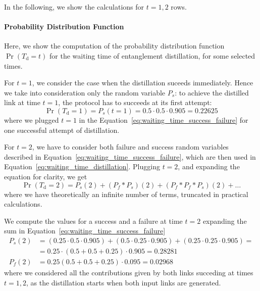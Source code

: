 \documentclass{masterthesis}
\begin{document}
In the following, we show the calculations for $t={1,2}$ rows.

\paragraph*{Probability Distribution Function}

Here, we show the computation of the probability distribution function $\Pr(T_{\text{d}} = t)$ for the waiting time of entanglement distillation, for some selected times.

For $t = 1$, we consider the case when the distillation suceeds immediately. Hence we take into consideration only the random variable $P_s$: to achieve the distilled link at time $t=1$, the protocol has to succeeds at its first attempt: 
\begin{equation}
    \Pr(T_{\text{d}} = 1) = P_s(t = 1) = 0.5 \cdot 0.5 \cdot 0.905 = 0.22625
\end{equation}
where we plugged $t = 1$ in the Equation~\ref{eq:waiting_time_success_failure} for one successful attempt of distillation.

For $t = 2$, we have to consider both failure and success random variables described in Equation~\ref{eq:waiting_time_success_failure}, which are then used in Equation~\ref{eq:waiting_time_distillation}. Plugging $t=2$, and expanding the equation for clarity, we get 
\begin{equation}\label{eq:distillation_t2}
    \Pr(T_{\text{d}} = 2) = P_s(2) + (P_f \ast P_s)(2) + (P_f \ast P_f \ast P_s)(2) + \ldots
\end{equation}
where we have theoretically an infinite number of terms, truncated in practical calculations.

We compute the values for a success and a failure at time $t=2$ expanding the sum in Equation~\ref{eq:waiting_time_success_failure}
\begin{align}
    P_s(2) &= \left(0.25 \cdot 0.5 \cdot 0.905\right) + \left(0.5 \cdot 0.25 \cdot 0.905\right) + \left(0.25 \cdot 0.25 \cdot 0.905\right) = \\
           &= 0.25 \cdot \left(0.5 + 0.5 + 0.25 \right) \cdot 0.905 = 0.28281 \\
    P_f(2) &= 0.25 \left(0.5 + 0.5 + 0.25\right) \cdot 0.095 = 0.02968
\end{align}
where we considered all the contributions given by both links succeding at times $t={1,2}$, as the distillation starts when both input links are generated.
\end{document}
